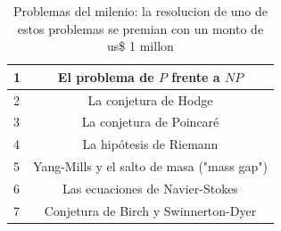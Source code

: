 \begin{table}%
\caption{Problemas del milenio: la resolucion de uno de estos problemas se premian con un monto de us\$ 1 millon}
\begin{center}
\begin{tabular}{  l c }
    \hline
    1 & El problema de $P$ frente a $NP$  \\ \hline
    2 &  La conjetura de Hodge \\ \hline
    3 &  La conjetura de Poincaré \\ \hline
    4 &  La hipótesis de Riemann \\ \hline
    5 &  Yang-Mills y el salto de masa ("mass gap")\\ \hline
    6 &  Las ecuaciones de Navier-Stokes\\ \hline
    7 &  Conjetura de Birch y Swinnerton-Dyer\\
        \hline
\end{tabular}
\end{center}
\label{table:prob_milenio}
\end{table}


